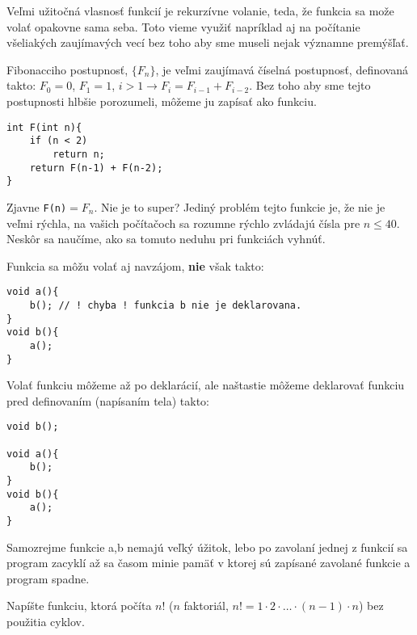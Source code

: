 \medskip

Veľmi užitočná vlasnosť funkcií je rekurzívne volanie, teda, že funkcia sa može
volať opakovne sama seba. Toto vieme využiť napríklad aj na počítanie
všeliakých zaujímavých vecí bez toho aby sme museli nejak významne
premýšľať.

Fibonacciho postupnosť, $\{F_n\}$,  je veľmi zaujímavá číselná postupnosť,
definovaná takto: $F_0 = 0$, $F_1 = 1$, $i>1 \rightarrow F_i = F_{i-1} +
F_{i-2}$.  Bez toho aby sme tejto postupnosti hlbšie porozumeli, môžeme ju
zapísať ako funkciu.

\begin{lstlisting}
int F(int n){
    if (n < 2)
        return n;
    return F(n-1) + F(n-2);
}
\end{lstlisting}

Zjavne \verb!F(n)!$ = F_n$. Nie je to super? Jediný problém tejto funkcie je,
že nie je veľmi rýchla, na vašich počítačoch sa rozumne rýchlo zvládajú čísla
pre $n \leq 40$. Neskôr sa naučíme, ako sa tomuto neduhu pri funkciách vyhnúť.

\medskip

Funkcia sa môžu volať aj navzájom, \textbf{nie} však takto:
\begin{lstlisting}
void a(){
    b(); // ! chyba ! funkcia b nie je deklarovana.
}
void b(){
    a();
}
\end{lstlisting}

Volať funkciu môžeme až po deklarácií, ale naštastie môžeme deklarovať
funkciu pred definovaním (napísaním tela) takto:

\begin{lstlisting}
void b();

void a(){
    b();
}
void b(){
    a();
}
\end{lstlisting}

Samozrejme funkcie a,b nemajú veľký úžitok, lebo po zavolaní jednej z funkcií
sa program zacyklí až sa časom minie pamäť v ktorej sú zapísané zavolané
funkcie a program spadne.

\cvicenie Napíšte funkciu, ktorá počíta $n!$ ($n$ faktoriál, $n! = 1\cdot
2\cdot\dots\cdot (n-1)\cdot n$) bez použitia cyklov.











